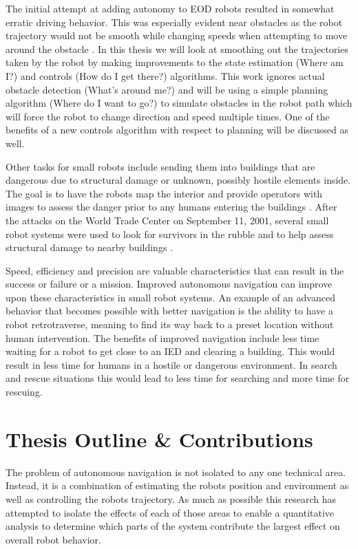 The initial attempt at adding autonomy to EOD robots resulted in somewhat erratic driving behavior. This was especially evident near obstacles as the robot trajectory would not be smooth while changing speeds when attempting to move around the obstacle \cite{Bruch00}. In this thesis we will look at smoothing out the trajectories taken by the robot by making improvements to the state estimation (Where am I?) and controls (How do I get there?) algorithms. This work ignores actual obstacle detection (What's around me?) and will be using a simple planning algorithm (Where do I want to go?) to simulate obstacles in the robot path which will force the robot to change direction and speed multiple times. One of the benefits of a new controls algorithm with respect to planning will be discussed as well.

Other tasks for small robots include sending them into buildings that are dangerous due to structural damage or unknown, possibly hostile elements inside. The goal is to have the robots map the interior and provide operators with images to assess the danger prior to any humans entering the buildings \cite{CongressUGV06}. After the attacks on the World Trade Center on September 11, 2001, several small robot systems were used to look for survivors in the rubble and to help assess structural damage to nearby buildings \cite{Everett02}.

Speed, efficiency and precision are valuable characteristics that can result in the success or failure or a mission. Improved autonomous navigation can improve upon these characteristics in small robot systems. An example of an advanced behavior that becomes possible with better navigation is the ability to have a robot retrotraverse, meaning to find its way back to a preset location without human intervention. The benefits of improved navigation include less time waiting for a robot to get close to an IED and clearing a building. This would result in less time for humans in a hostile or dangerous environment. In search and rescue situations this would lead to less time for searching and more time for rescuing.

\section{Thesis Outline \& Contributions}
\label{sec:outline}
The problem of autonomous navigation is not isolated to any one technical area. Instead, it is a combination of estimating the robots position and environment as well as controlling the robots trajectory. As much as possible this research has attempted to isolate the effects of each of those areas to enable a quantitative analysis to determine which parts of the system contribute the largest effect on overall robot behavior.


